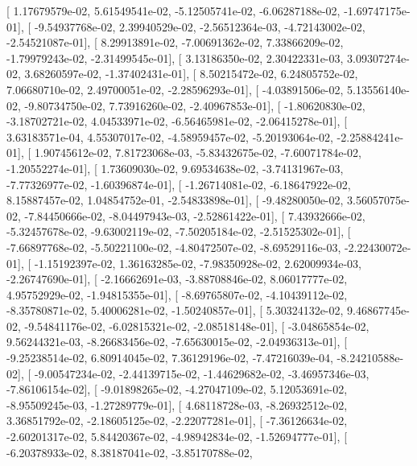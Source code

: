 \documentclass{article}
\begin{document}
       [  1.17679579e-02,   5.61549541e-02,  -5.12505741e-02,
         -6.06287188e-02,  -1.69747175e-01],
       [ -9.54937768e-02,   2.39940529e-02,  -2.56512364e-03,
         -4.72143002e-02,  -2.54521087e-01],
       [  8.29913891e-02,  -7.00691362e-02,   7.33866209e-02,
         -1.79979243e-02,  -2.31499545e-01],
       [  3.13186350e-02,   2.30422331e-03,   3.09307274e-02,
          3.68260597e-02,  -1.37402431e-01],
       [  8.50215472e-02,   6.24805752e-02,   7.06680710e-02,
          2.49700051e-02,  -2.28596293e-01],
       [ -4.03891506e-02,   5.13556140e-02,  -9.80734750e-02,
          7.73916260e-02,  -2.40967853e-01],
       [ -1.80620830e-02,  -3.18702721e-02,   4.04533971e-02,
         -6.56465981e-02,  -2.06415278e-01],
       [  3.63183571e-04,   4.55307017e-02,  -4.58959457e-02,
         -5.20193064e-02,  -2.25884241e-01],
       [  1.90745612e-02,   7.81723068e-03,  -5.83432675e-02,
         -7.60071784e-02,  -1.20552274e-01],
       [  1.73609030e-02,   9.69534638e-02,  -3.74131967e-03,
         -7.77326977e-02,  -1.60396874e-01],
       [ -1.26714081e-02,  -6.18647922e-02,   8.15887457e-02,
          1.04854752e-01,  -2.54833898e-01],
       [ -9.48280050e-02,   3.56057075e-02,  -7.84450666e-02,
         -8.04497943e-03,  -2.52861422e-01],
       [  7.43932666e-02,  -5.32457678e-02,  -9.63002119e-02,
         -7.50205184e-02,  -2.51525302e-01],
       [ -7.66897768e-02,  -5.50221100e-02,  -4.80472507e-02,
         -8.69529116e-03,  -2.22430072e-01],
       [ -1.15192397e-02,   1.36163285e-02,  -7.98350928e-02,
          2.62009934e-03,  -2.26747690e-01],
       [ -2.16662691e-03,  -3.88708846e-02,   8.06017777e-02,
          4.95752929e-02,  -1.94815355e-01],
       [ -8.69765807e-02,  -4.10439112e-02,  -8.35780871e-02,
          5.40006281e-02,  -1.50240857e-01],
       [  5.30324132e-02,   9.46867745e-02,  -9.54841176e-02,
         -6.02815321e-02,  -2.08518148e-01],
       [ -3.04865854e-02,   9.56244321e-03,  -8.26683456e-02,
         -7.65630015e-02,  -2.04936313e-01],
       [ -9.25238514e-02,   6.80914045e-02,   7.36129196e-02,
         -7.47216039e-04,  -8.24210588e-02],
       [ -9.00547234e-02,  -2.44139715e-02,  -1.44629682e-02,
         -3.46957346e-03,  -7.86106154e-02],
       [ -9.01898265e-02,  -4.27047109e-02,   5.12053691e-02,
         -8.95509245e-03,  -1.27289779e-01],
       [  4.68118728e-03,  -8.26932512e-02,   3.36851792e-02,
         -2.18605125e-02,  -2.22077281e-01],
       [ -7.36126634e-02,  -2.60201317e-02,   5.84420367e-02,
         -4.98942834e-02,  -1.52694777e-01],
       [ -6.20378933e-02,   8.38187041e-02,  -3.85170788e-02,
\end{document}
